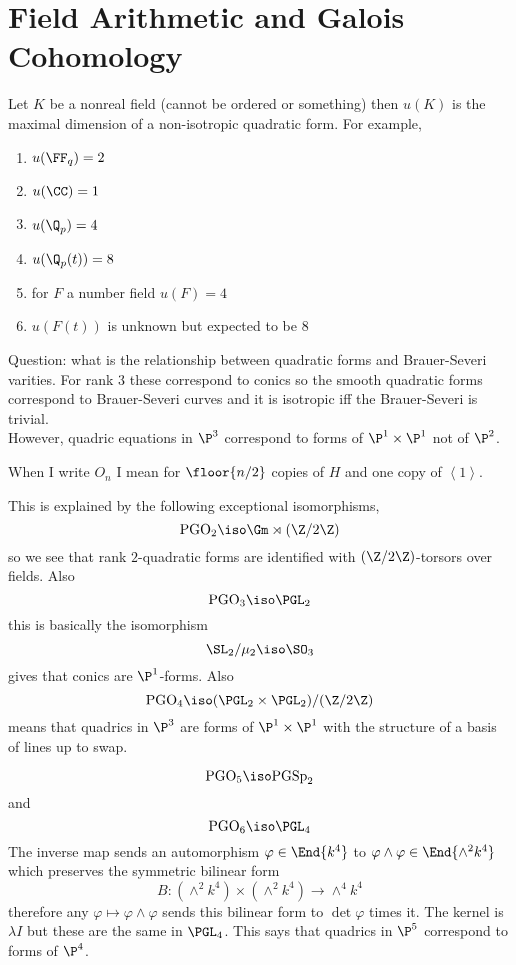 \documentclass{article}
\begin{document}
\section{Field Arithmetic and Galois Cohomology}

Let $K$ be a nonreal field (cannot be ordered or something) then $u(K)$ is the maximal dimension of a non-isotropic quadratic form. For example,
\begin{enumerate}
\item $u(\FF_q) = 2$ 
\item $u(\CC) = 1$
\item $u(\Q_p) = 4$
\item $u(\Q_p(t)) = 8$
\item for $F$ a number field $u(F) = 4$
\item $u(F(t))$ is unknown but expected to be $8$
\end{enumerate}

Question: what is the relationship between quadratic forms and Brauer-Severi varities. For rank $3$ these correspond to conics so the smooth quadratic forms correspond to Brauer-Severi curves and it is isotropic iff the Brauer-Severi is trivial. 
\bigskip\\
However, quadric equations in $\P^3$ correspond to forms of $\P^1 \times \P^1$ not of $\P^2$. 

\begin{rmk}
When I write $O_n$ I mean for $\floor{n/2}$ copies of $H$ and one copy of $\left< 1 \right>$. 
\end{rmk}

\newcommand{\PGO}{\mathrm{PGO}}

This is explained by the following exceptional isomorphisms,
\[ \PGO_2 \iso \Gm \rtimes (\Z / 2 \Z) \]
so we see that rank $2$-quadratic forms are identified with $(\Z / 2 \Z)$-torsors over fields. Also
\[ \PGO_3 \iso \PGL_2 \]
this is basically the isomorphism
\[ \SL_2 / \mu_2 \iso \SO_3 \]
gives that conics are $\P^1$-forms. Also
\[ \PGO_4 \iso (\PGL_2 \times \PGL_2)/(\Z / 2 \Z) \]
means that quadrics in $\P^3$ are forms of $\P^1 \times \P^1$ with the structure of a basis of lines up to swap. 

\[ \PGO_5 \iso \mathrm{PGSp}_2 \]
and
\[ \PGO_6 \iso \PGL_4 \]
The inverse map
sends an automorphism $\varphi \in \End{k^4}$ to $\varphi \wedge \varphi \in \End{\wedge^2 k^4}$ which preserves the symmetric bilinear form
\[ B : (\wedge^2 k^4) \times (\wedge^2 k^4) \to \wedge^4 k^4 \]
therefore any $\varphi \mapsto \varphi \wedge \varphi$ sends this bilinear form to $\det{\varphi}$ times it. The kernel is $\lambda I$ but these are the same in $\PGL_4$. This
says that quadrics in $\P^5$ correspond to forms of $\P^4$. 
\end{document}
